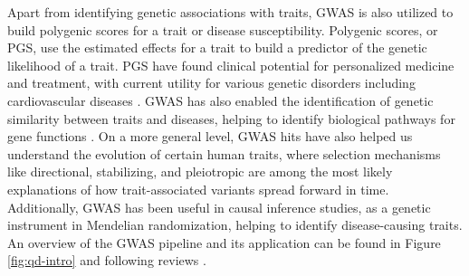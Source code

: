 Apart from identifying genetic associations with traits, GWAS is also utilized to build polygenic scores for a trait or disease susceptibility. Polygenic scores, or PGS, use the estimated effects for a trait to build a predictor of the genetic likelihood of a trait. PGS have found clinical potential for personalized medicine and treatment, with current utility for various genetic disorders including cardiovascular diseases \cite{torkamani2018personal}. GWAS has also enabled the identification of genetic similarity between traits and diseases, helping to identify biological pathways for gene functions \cite{solovieff2013pleiotropy}. On a more general level, GWAS hits have also helped us understand the evolution of certain human traits, where selection mechanisms like directional, stabilizing, and pleiotropic are among the most likely explanations of how trait-associated variants spread forward in time. Additionally, GWAS has been useful in causal inference studies, as a genetic instrument in Mendelian randomization, helping to identify disease-causing traits. An overview of the GWAS pipeline and its application can be found in Figure \ref{fig:qd-intro} and following reviews \cite{visscher201710, abdellaoui202315}.

